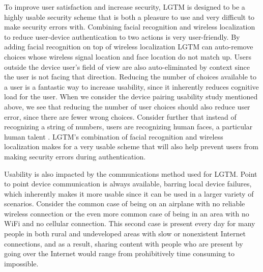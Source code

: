 \documentclass[12pt]{report}
\begin{document}
To improve user satisfaction and increase security, LGTM is designed to be a highly usable security scheme that is both a pleasure to use and very difficult to make security errors with. Combining facial recognition and wireless localization to reduce user-device authentication to two actions is very user-friendly. By adding facial recognition on top of wireless localization LGTM can auto-remove choices whose wireless signal location and face location do not match up. Users outside the device user's field of view are also auto-eliminated by context since the user is not facing that direction. Reducing the number of choices available to a user is a fantastic way to increase usability, since it inherently reduces cognitive load for the user. When we consider the device pairing usability study mentioned above, we see that reducing the number of user choices should also reduce user error, since there are fewer wrong choices. Consider further that instead of recognizing a string of numbers, users are recognizing human faces, a particular human talent \cite{NewbornsFaceRecognitionTurati2006}. LGTM's combination of facial recognition and wireless localization makes for a very usable scheme that will also help prevent users from making security errors during authentication. \par

Usability is also impacted by the communications method used for LGTM. Point to point device communication is always available, barring local device failures, which inherently makes it more usable since it can be used in a larger variety of scenarios. Consider the common case of being on an airplane with no reliable wireless connection or the even more common case of being in an area with no WiFi and no cellular connection. This second case is present every day for many people in both rural and undeveloped areas with slow or nonexistent Internet connections, and as a result, sharing content with people who are present by going over the Internet would range from prohibitively time consuming to impossible. \par

\end{document}
